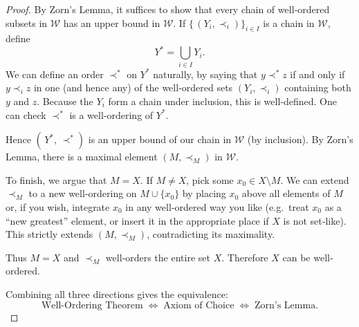 \documentclass[12pt]{article}
\theoremstyle{definition} %
\theoremstyle{plain} %
\begin{document}
\begin{proof}
                                By Zorn’s Lemma, it suffices to show that every chain of well‐ordered subsets in $\mathcal{W}$ has an upper bound in $\mathcal{W}$. If $\{\,(Y_i,\prec_i)\}_{i\in I}$ is a chain in $\mathcal{W}$, define 
                                \[
                                Y^* = \bigcup_{i\in I} Y_i.
                                \]
                                We can define an order $\prec^*$ on $Y^*$ naturally, by saying that $y \prec^* z$ if and only if $y \prec_i z$ in one (and hence any) of the well‐ordered sets $(Y_i,\prec_i)$ containing both $y$ and $z$. Because the $Y_i$ form a chain under inclusion, this is well‐defined. One can check $\prec^*$ is a well‐ordering of $Y^*$.
                                
                                Hence $(\,Y^*,\,\prec^*)$ is an upper bound of our chain in $\mathcal{W}$ (by inclusion). By Zorn’s Lemma, there is a maximal element $(M,\prec_M)$ in $\mathcal{W}$. 
                                
                                To finish, we argue that $M = X$. If $M \neq X$, pick some $x_0 \in X\setminus M$. We can extend $\prec_M$ to a new well‐ordering on $M \cup \{x_0\}$ by placing $x_0$ above all elements of $M$ or, if you wish, integrate $x_0$ in any well‐ordered way you like (e.g.\ treat $x_0$ as a “new greatest” element, or insert it in the appropriate place if $X$ is not set‐like). This strictly extends $(M,\prec_M)$, contradicting its maximality. 
                                
                                Thus $M = X$ and $\prec_M$ well‐orders the entire set $X$. Therefore $X$ can be well‐ordered.
                                
                                \medskip
                                
                                Combining all three directions gives the equivalence: 
                                \[
                                \text{Well-Ordering Theorem} 
                                \;\iff\;
                                \text{Axiom of Choice} 
                                \;\iff\;
                                \text{Zorn's Lemma}.
                                \]
                                \end{proof}
\end{document}
